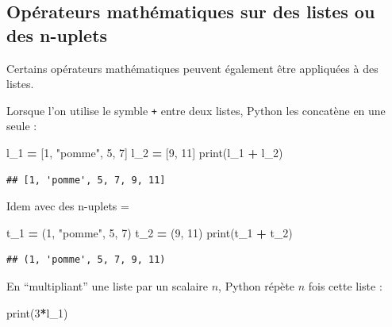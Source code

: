 \documentclass[12pt,]{book}
\newenvironment{Shaded}{\begin{snugshade}}{\end{snugshade}}
\newcommand{\DecValTok}[1]{\textcolor[rgb]{0.00,0.00,0.81}{#1}}
\newcommand{\StringTok}[1]{\textcolor[rgb]{0.31,0.60,0.02}{#1}}
\newcommand{\OperatorTok}[1]{\textcolor[rgb]{0.81,0.36,0.00}{\textbf{#1}}}
\newcommand{\BuiltInTok}[1]{#1}
\newcommand{\NormalTok}[1]{#1}
\numberwithin{equation}{section}
\numberwithin{countremarque}{section}
\begin{document}
\subsection{Opérateurs mathématiques sur des listes ou des
n-uplets}\label{operateurs-mathematiques-sur-des-listes-ou-des-n-uplets}

Certains opérateurs mathématiques peuvent également être appliquées à
des listes.

Lorsque l'on utilise le symble \texttt{+} entre deux listes, Python les
concatène en une seule :

\begin{Shaded}
\begin{Highlighting}[]
\NormalTok{l_1 }\OperatorTok{=}\NormalTok{ [}\DecValTok{1}\NormalTok{, }\StringTok{"pomme"}\NormalTok{, }\DecValTok{5}\NormalTok{, }\DecValTok{7}\NormalTok{]}
\NormalTok{l_2 }\OperatorTok{=}\NormalTok{ [}\DecValTok{9}\NormalTok{, }\DecValTok{11}\NormalTok{]}
\BuiltInTok{print}\NormalTok{(l_1 }\OperatorTok{+}\NormalTok{ l_2)}
\end{Highlighting}
\end{Shaded}

\begin{lstlisting}
## [1, 'pomme', 5, 7, 9, 11]
\end{lstlisting}

Idem avec des n-uplets =

\begin{Shaded}
\begin{Highlighting}[]
\NormalTok{t_1 }\OperatorTok{=}\NormalTok{ (}\DecValTok{1}\NormalTok{, }\StringTok{"pomme"}\NormalTok{, }\DecValTok{5}\NormalTok{, }\DecValTok{7}\NormalTok{)}
\NormalTok{t_2 }\OperatorTok{=}\NormalTok{ (}\DecValTok{9}\NormalTok{, }\DecValTok{11}\NormalTok{)}
\BuiltInTok{print}\NormalTok{(t_1 }\OperatorTok{+}\NormalTok{ t_2)}
\end{Highlighting}
\end{Shaded}

\begin{lstlisting}
## (1, 'pomme', 5, 7, 9, 11)
\end{lstlisting}

En ``multipliant'' une liste par un scalaire \(n\), Python répète \(n\)
fois cette liste :

\begin{Shaded}
\begin{Highlighting}[]
\BuiltInTok{print}\NormalTok{(}\DecValTok{3}\OperatorTok{*}\NormalTok{l_1)}
\end{Highlighting}
\end{Shaded}
\end{document}
